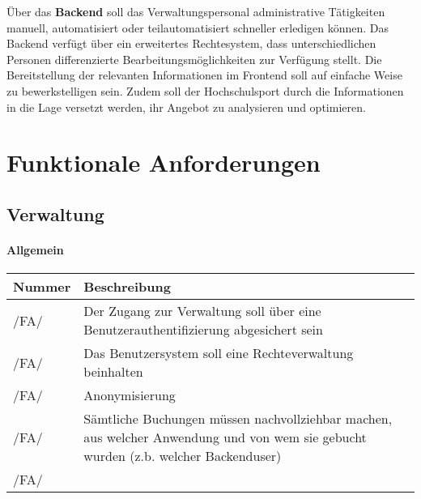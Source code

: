 \documentclass[a4paper,12pt]{article}
\newcommand\addrow[2]{#1 &#2\\ }
\newcommand\addheading[2]{#1 &#2\\ \hline}
\newcommand\tabularhead{\begin{tabular}{lp{13cm}}
\hline
}
\newenvironment{usecase}{\tabularhead}
{\hline\end{tabular}}
\begin{document}
Über das \textbf{Backend} soll das Verwaltungspersonal administrative Tätigkeiten manuell, automatisiert oder teilautomatisiert schneller erledigen können. Das Backend verfügt über ein erweitertes Rechtesystem, dass unterschiedlichen Personen differenzierte Bearbeitungsmöglichkeiten zur Verfügung stellt. Die Bereitstellung der relevanten Informationen im Frontend soll auf einfache Weise zu bewerkstelligen sein. Zudem soll der Hochschulsport durch die Informationen in die Lage versetzt werden, ihr Angebot zu analysieren und optimieren.

\section{Funktionale Anforderungen}
\subsection{Verwaltung}
\paragraph{\textbf{Allgemein}\\}
\begin{usecase}
  \addheading{Nummer}{Beschreibung} 
  \addrow{/FA/}{Der Zugang zur Verwaltung soll über eine Benutzerauthentifizierung abgesichert sein}
  \addrow{/FA/}{Das Benutzersystem soll eine Rechteverwaltung beinhalten}
  \addrow{/FA/}{Anonymisierung}
  \addrow{/FA/}{Sämtliche Buchungen müssen nachvollziehbar machen, aus welcher Anwendung und von wem sie gebucht wurden (z.b. welcher Backenduser)}
  \addrow{/FA/}{}
\end{usecase}
\end{document}
